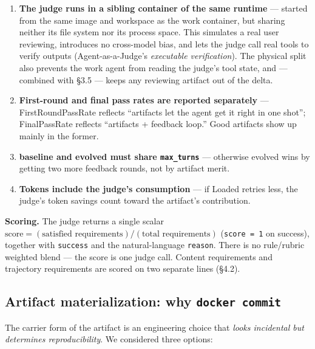 \documentclass{article}
\begin{document}
\begin{enumerate}
\item \textbf{The judge runs in a sibling container of the same runtime} --- started from the same image and workspace as the work container, but sharing neither its file system nor its process space. This simulates a real user reviewing, introduces no cross-model bias, and lets the judge call real tools to verify outputs (Agent-as-a-Judge's \emph{executable verification}). The physical split also prevents the work agent from reading the judge's tool state, and --- combined with \S3.5 --- keeps any reviewing artifact out of the delta.
\item \textbf{First-round and final pass rates are reported separately} --- FirstRoundPassRate reflects ``artifacts let the agent get it right in one shot''; FinalPassRate reflects ``artifacts + feedback loop.'' Good artifacts show up mainly in the former.
\item \textbf{baseline and evolved must share \texttt{max\_turns}} --- otherwise evolved wins by getting two more feedback rounds, not by artifact merit.
\item \textbf{Tokens include the judge's consumption} --- if Loaded retries less, the judge's token savings count toward the artifact's contribution.
\end{enumerate}

\textbf{Scoring.} The judge returns a single scalar $\text{score} = (\text{satisfied requirements}) / (\text{total requirements})$ (\texttt{score = 1} on success), together with \texttt{success} and the natural-language \texttt{reason}. There is no rule/rubric weighted blend --- the score is one judge call. Content requirements and trajectory requirements are scored on two separate lines (\S4.2).

\subsection{Artifact materialization: why \texttt{docker commit}}

The carrier form of the artifact is an engineering choice that \emph{looks incidental but determines reproducibility}. We considered three options:
\end{document}

